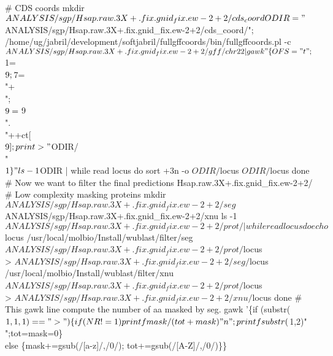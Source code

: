 \documentclass[11pt]{article}
\begin{document}
\nwenddocs{}\endmoddef
# CDS coords
mkdir $ANALYSIS/sgp/Hsap.raw.3X+.fix.gnid_fix.ew-2+2/cds_coord
ODIR="$ANALYSIS/sgp/Hsap.raw.3X+.fix.gnid_fix.ew-2+2/cds_coord/";
/home/ug/jabril/development/softjabril/fullgffcoords/bin/fullgffcoords.pl -c\\
  $ANALYSIS/sgp/Hsap.raw.3X+.fix.gnid_fix.ew-2+2/gff/chr22 | 
  gawk "\{OFS=\\"\\t\\";\\$1=\\$9;\\$7=\\"+\\";\\$9=\\$9\\".\\"++ct[\\$9];print  > \\"$ODIR/\\" \\$1\}" 
ls -1 $ODIR | while read locus
do
   sort +3n -o $ODIR/$locus $ODIR/$locus
done
# Now we want to filter the final predictions Hsap.raw.3X+.fix.gnid_fix.ew-2+2/
# Low complexity masking proteins
mkdir $ANALYSIS/sgp/Hsap.raw.3X+.fix.gnid_fix.ew-2+2/seg $ANALYSIS/sgp/Hsap.raw.3X+.fix.gnid_fix.ew-2+2/xnu
ls -1 $ANALYSIS/sgp/Hsap.raw.3X+.fix.gnid_fix.ew-2+2/prot/ | while read locus
do
    echo $locus 
    /usr/local/molbio/Install/wublast/filter/seg \\
         $ANALYSIS/sgp/Hsap.raw.3X+.fix.gnid_fix.ew-2+2/prot/$locus \\
         > $ANALYSIS/sgp/Hsap.raw.3X+.fix.gnid_fix.ew-2+2/seg/$locus
    /usr/local/molbio/Install/wublast/filter/xnu \\
    $ANALYSIS/sgp/Hsap.raw.3X+.fix.gnid_fix.ew-2+2/prot/$locus \\
         > $ANALYSIS/sgp/Hsap.raw.3X+.fix.gnid_fix.ew-2+2/xnu/$locus
done
# This gawk line compute the number of aa masked by seg.
gawk '\{if (substr($1,1,1)==">") \\
   \{if (NR!=1) printf mask/(tot+mask)"\\n";printf substr($1,2)" ";tot=mask=0\}\\
   else \{mask+=gsub(/[a-z]/,/0/); tot+=gsub(/[A-Z]/,/0/)\}\}\\
\end{document}
